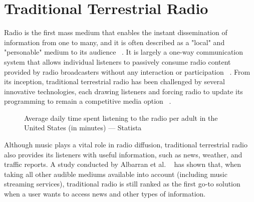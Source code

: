 


\section{Traditional Terrestrial Radio}
\label{chap:ttr}
Radio is the first mass medium that enables the instant dissemination of information from one to many, and it is often described as a "local" and "personable" medium to its audience ~\cite{Ren2004}. It is largely a one-way communication system that allows individual listeners to passively consume radio content provided by radio broadcasters without any interaction or participation ~\cite{Gazi2011}. From its inception, traditional terrestrial radio has been challenged by several innovative technologies, each drawing listeners and forcing radio to update its programming to remain a competitive media option ~\cite{Albarran2007}. 

\begin{figure}
 \centering
\caption{Average daily time spent listening to the radio per adult in the United States (in minutes) —  Statista}
\label{fig:test_env}
\end{figure}


Although music plays a vital role in radio diffusion, traditional terrestrial radio also provides its listeners with useful information, such as news, weather, and traffic reports. A study conducted by Albarran et al. ~\cite{Albarran2007} has shown that, when taking all other audible mediums available into account (including music streaming services), traditional radio is still ranked as the first go-to solution when a user wants to access news and other types of information. 


